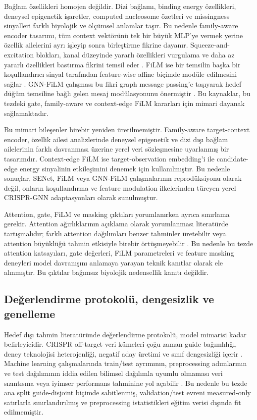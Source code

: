 Bağlam özellikleri homojen değildir. Dizi bağlamı, binding energy özellikleri, deneysel epigenetik işaretler, computed nucleosome özetleri ve missingness sinyalleri farklı biyolojik ve ölçümsel anlamlar taşır. Bu nedenle family-aware encoder tasarımı, tüm context vektörünü tek bir büyük MLP'ye vermek yerine özellik ailelerini ayrı işleyip sonra birleştirme fikrine dayanır. Squeeze-and-excitation blokları, kanal düzeyinde yararlı özellikleri vurgulama ve daha az yararlı özellikleri bastırma fikrini temsil eder . FiLM ise bir temsilin başka bir koşullandırıcı sinyal tarafından feature-wise affine biçimde modüle edilmesini sağlar . GNN-FiLM çalışması bu fikri graph message passing'e taşıyarak hedef düğüm temsiline bağlı gelen mesaj modülasyonunu önermiştir . Bu kaynaklar, bu tezdeki gate, family-aware ve context-edge FiLM kararları için mimari dayanak sağlamaktadır.

Bu mimari bileşenler birebir yeniden üretilmemiştir. Family-aware target-context encoder, özellik ailesi analizlerinde deneysel epigenetik ve dizi dışı bağlam ailelerinin farklı davranması üzerine yerel veri sözleşmesine uyarlanmış bir tasarımdır. Context-edge FiLM ise target-observation embedding'i ile candidate-edge energy sinyalinin etkileşimini denemek için kullanılmıştır. Bu nedenle sonuçlar, SENet, FiLM veya GNN-FiLM çalışmalarının reprodüksiyonu olarak değil, onların koşullandırma ve feature modulation ilkelerinden türeyen yerel CRISPR-GNN adaptasyonları olarak sunulmuştur.

Attention, gate, FiLM ve masking çıktıları yorumlanırken ayrıca sınırlama gerekir. Attention ağırlıklarının açıklama olarak yorumlanması literatürde tartışmalıdır; farklı attention dağılımları benzer tahminler üretebilir veya attention büyüklüğü tahmin etkisiyle birebir örtüşmeyebilir . Bu nedenle bu tezde attention katsayıları, gate değerleri, FiLM parametreleri ve feature masking deneyleri model davranışını anlamaya yarayan teknik kanıtlar olarak ele alınmıştır. Bu çıktılar bağımsız biyolojik nedensellik kanıtı değildir.

\subsection{Değerlendirme protokolü, dengesizlik ve genelleme}

Hedef dışı tahmin literatüründe değerlendirme protokolü, model mimarisi kadar belirleyicidir. CRISPR off-target veri kümeleri çoğu zaman guide bağımlılığı, deney teknolojisi heterojenliği, negatif aday üretimi ve sınıf dengesizliği içerir . Machine learning çalışmalarında train/test ayrımının, preprocessing adımlarının ve test dağılımının iddia edilen bilimsel dağılımla uyumlu olmaması veri sızıntısına veya iyimser performans tahminine yol açabilir . Bu nedenle bu tezde ana split guide-disjoint biçimde sabitlenmiş, validation/test evreni measured-only satırlarla sınırlandırılmış ve preprocessing istatistikleri eğitim verisi dışında fit edilmemiştir.

